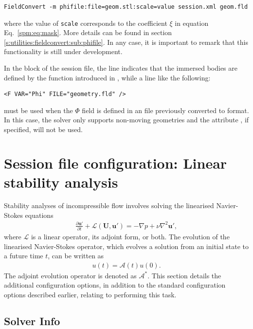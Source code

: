 \begin{lstlisting}[style=BashInputStyle]
    FieldConvert -m phifile:file=geom.stl:scale=value session.xml geom.fld
\end{lstlisting}

where the value of \texttt{scale} corresponds to the coefficient $\xi$ in
equation Eq.~\eqref{spm:eq:mask}. More details can be found in section~
\ref{s:utilities:fieldconvert:sub:phifile}. In any case, it is important to
remark that this functionality is still under development.

In the  block of the session file, the line
 indicates that the immersed bodies are defined by
the function introduced in , while a line like the following:

\begin{lstlisting}[style=XMLStyle]
    <F VAR="Phi" FILE="geometry.fld" />
\end{lstlisting}

must be used when the $\Phi$ field is defined in an  file
previously converted to  format. In this case, the solver only
supports non-moving geometries and the attribute
, if specified, will not be used.


\section{Session file configuration: Linear stability analysis}
\label{SecStabFile}
Stability analyses of incompressible flow involves solving the linearised Navier-Stokes equations
\begin{align*}
    \frac{\partial\mathbf{u'}}{\partial t} +\mathcal{L}(\mathbf{U},\mathbf{u'})=-\nabla p+\nu \nabla^2 \mathbf{u'},
\end{align*}
where $\mathcal{L}$ is a linear operator, its adjoint form, or both. The evolution of the linearised Navier-Stokes operator, which evolves a solution from an initial state to a future time $t$, can be written as
\begin{align*}
u(t) = \mathcal{A}(t)u(0).
\end{align*}
The adjoint evolution operator is denoted as $\mathcal{A}^*$.
This section details the additional configuration options, in addition to the standard configuration options described earlier, relating to performing this task.

\subsection{Solver Info}
\label{SectionIncNS_SolverInfo_Stab}

